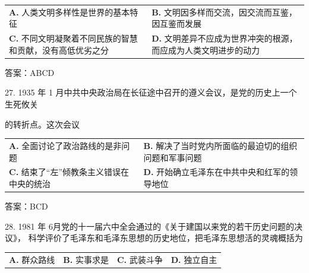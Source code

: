 \documentclass[UTF8,11pt]{ctexart}
\begin{document}
\begin{center}\begin{tabular}{>{\raggedright\arraybackslash}p{\dimexpr(\linewidth-4\tabcolsep)/2\relax}>{\raggedright\arraybackslash}p{\dimexpr(\linewidth-4\tabcolsep)/2\relax}}
\textbf{A.} 人类文明多样性是世界的基本特征 & \textbf{B.} 文明因多样而交流，因交流而互鉴，因互鉴而发展\\[.35em]
\textbf{C.} 不同文明凝聚着不同民族的智慧和贡献，没有高低优劣之分 & \textbf{D.} 文明差异不应成为世界冲突的根源，而应成为人类文明进步的动力\\[.35em]\end{tabular}\end{center}

答案：ABCD


27. 1935 年 1 月中共中央政治局在长征途中召开的遵义会议，是党的历史上一个生死攸关


的转折点。这次会议


\begin{center}\begin{tabular}{>{\raggedright\arraybackslash}p{\dimexpr(\linewidth-4\tabcolsep)/2\relax}>{\raggedright\arraybackslash}p{\dimexpr(\linewidth-4\tabcolsep)/2\relax}}
\textbf{A.} 全面讨论了政治路线的是非问题 & \textbf{B.} 解决了当时党内所面临的最迫切的组织问题和军事问题\\[.35em]
\textbf{C.} 结束了“左”倾教条主义错误在中央的统治 & \textbf{D.} 开始确立毛泽东在中共中央和红军的领导地位\\[.35em]\end{tabular}\end{center}

答案：BCD


28. 1981 年 6月党的十一届六中全会通过的《关于建国以来党的若干历史问题的决议》， 科学评价了毛泽东和毛泽东思想的历史地位，把毛泽东思想活的灵魂概括为


\begin{center}\begin{tabular}{>{\raggedright\arraybackslash}p{\dimexpr(\linewidth-8\tabcolsep)/4\relax}>{\raggedright\arraybackslash}p{\dimexpr(\linewidth-8\tabcolsep)/4\relax}>{\raggedright\arraybackslash}p{\dimexpr(\linewidth-8\tabcolsep)/4\relax}>{\raggedright\arraybackslash}p{\dimexpr(\linewidth-8\tabcolsep)/4\relax}}
\textbf{A.} 群众路线 & \textbf{B.} 实事求是 & \textbf{C.} 武装斗争 & \textbf{D.} 独立自主\\[.35em]\end{tabular}\end{center}
\end{document}
